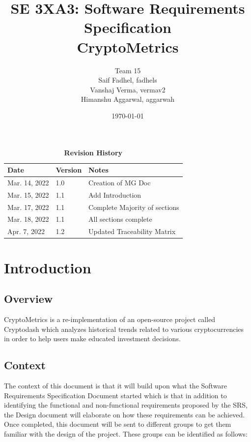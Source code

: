 \documentclass[12pt, titlepage]{article}
\title{SE 3XA3: Software Requirements Specification\\CryptoMetrics}
\author{Team 15
		\\ Saif Fadhel, fadhels
		\\ Vanshaj Verma, vermav2
		\\ Himanshu Aggarwal, aggarwah
}
\date{\today}
\begin{document}
\maketitle

\tableofcontents
\listoftables
\listoffigures
\newpage
\begin{table}[h!]
\caption{\bf Revision History}
\begin{tabularx}{\textwidth}{p{3cm}p{2cm}X}
\toprule {\bf Date} & {\bf Version} & {\bf Notes}\\
\midrule
Mar. 14, 2022 & 1.0 & Creation of MG Doc\\
Mar. 15, 2022 & 1.1 & Add Introduction\\
Mar. 17, 2022 & 1.1 & Complete Majority of sections\\
Mar. 18, 2022 & 1.1 & All sections complete\\
Apr. 7, 2022 & 1.2 & Updated Traceability Matrix
\bottomrule
\end{tabularx}
\end{table}

\newpage


\section{Introduction}

\subsection{Overview}

CryptoMetrics is a re-implementation of an open-source project called Cryptodash which analyzes historical trends related to various cryptocurrencies in order to help users make educated investment decisions.

\subsection{Context}

The context of this document is that it will build upon what the Software Requirements Specification Document started which is that in addition to identifying the functional and non-functional requirements proposed by the SRS, the Design document will elaborate on how these requirements can be achieved. Once completed, this document will be sent to different groups to get them familiar with the design of the project. These groups can be identified as follows:
\end{document}
